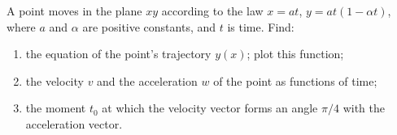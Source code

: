 
\item A point moves in the plane $xy$ according to the law $x = at$, $y = at(1 - \alpha t)$, where $a$ and $\alpha$ are positive constants, and $t$ is time. Find:
\begin{enumerate}
    \item the equation of the point’s trajectory $y(x)$; plot this function;
    \item the velocity $v$ and the acceleration $w$ of the point as functions of time;
    \item the moment $t_0$ at which the velocity vector forms an angle $\pi/4$ with the acceleration vector.
\end{enumerate}
